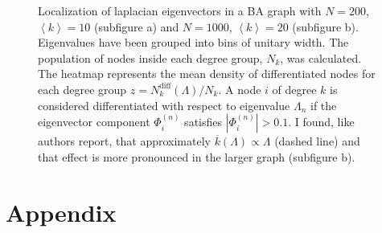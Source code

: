 \begin{figure}[H]
    \centering
{}
\caption{Localization of laplacian eigenvectors in a BA graph with $N=200$, $\left \langle k\right \rangle=10$ (subfigure a) and $N=1000$, $\left \langle k \right \rangle=20$ (subfigure b). Eigenvalues have been grouped into bins of unitary width. The population of nodes inside each degree group, $N_k$, was calculated. The heatmap represents the mean density of differentiated nodes for each degree group $z = N_k^{\text{diff}}(\Lambda)/N_k$. A node $i$ of degree $k$ is considered differentiated with respect to eigenvalue $\Lambda_n$ if the eigenvector component $\Phi_i^{(n)}$ satisfies $|\Phi_i^{(n)}|> 0.1$. I found, like authors \cite{main_network} report, that approximately $\overline{k}(\Lambda) \propto \Lambda$ (dashed line) and that effect is more pronounced in the larger graph (subfigure b).}
\label{fig:heatmap}
\end{figure}

\nocite{bio_article}
\nocite{murray}
\nocite{altbook}
\newpage
\section*{Appendix}
